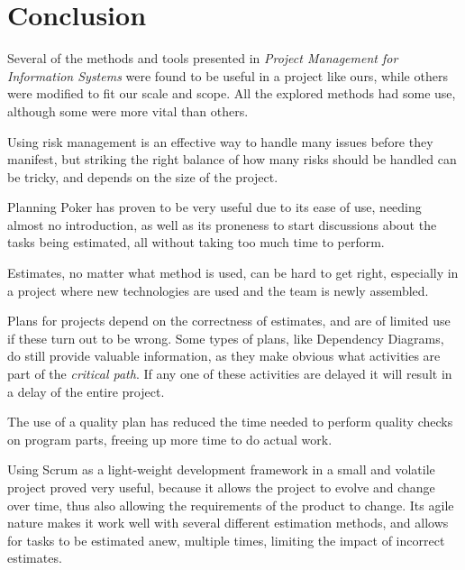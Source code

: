 \section{Conclusion}

Several of the methods and tools presented in \emph{Project Management for
Information Systems}\cite{caye} were found to be useful in a project like ours,
while others were modified to fit our scale and scope. All the explored methods
had some use, although some were more vital than others.

Using risk management is an effective way to handle many issues before they
manifest, but striking the right balance of how many risks should be handled
can be tricky, and depends on the size of the project.

Planning Poker has proven to be very useful due to its ease of use, needing
almost no introduction, as well as its proneness to start discussions about the
tasks being estimated, all without taking too much time to perform.

Estimates, no matter what method is used, can be hard to get right, especially
in a project where new technologies are used and the team is newly assembled.

Plans for projects depend on the correctness of estimates, and are of limited
use if these turn out to be wrong. Some types of plans, like Dependency Diagrams,
do still provide valuable information, as they make obvious what activities are
part of the \emph{critical path}. If any one of these activities are delayed it
will result in a delay of the entire project.

The use of a quality plan has reduced the time needed to perform quality checks
on program parts, freeing up more time to do actual work.

Using Scrum as a light-weight development framework in a small and volatile
project proved very useful, because it allows the project to evolve and change
over time, thus also allowing the requirements of the product to change. Its
agile nature makes it work well with several different estimation methods, and
allows for tasks to be estimated anew, multiple times, limiting the impact of
incorrect estimates.